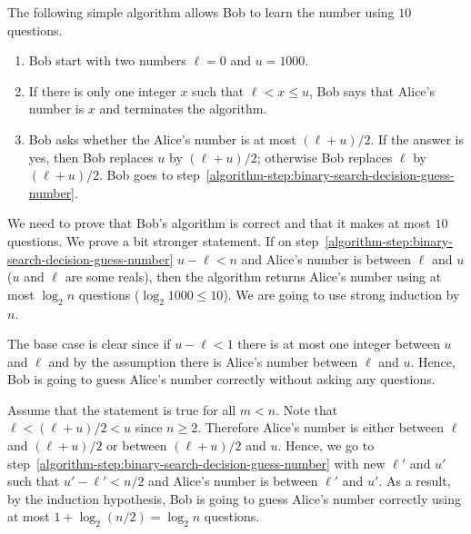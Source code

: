 The following simple algorithm allows Bob to learn the number using $10$
questions.

\begin{enumerate}
  \item Bob start with two numbers $\ell = 0$ and $u = 1000$.
  \item \label{algorithm-step:binary-search-result-guess-number}
    If there is only one integer $x$ such that $\ell < x \le u$, Bob says that
    Alice's number is $x$ and terminates the algorithm.
  \item \label{algorithm-step:binary-search-decision-guess-number}
    Bob asks whether the Alice's number is at most $(\ell + u) / 2$. If the
    answer is yes, then Bob replaces $u$ by $(\ell + u) / 2$; otherwise Bob
    replaces $\ell$ by $(\ell + u) / 2$.
    Bob goes to step~\ref{algorithm-step:binary-search-decision-guess-number}.
\end{enumerate}

We need to prove that Bob's algorithm is correct and that it makes at most $10$
questions. We prove a bit stronger statement. If on
step~\ref{algorithm-step:binary-search-decision-guess-number} $u - \ell < n$ and
Alice's number is between $\ell$ and $u$ ($u$ and $\ell$ are some reals), then
the algorithm returns Alice's number using at most $\log_2 n$ questions 
($\log_2 1000 \le 10$). We are going to use strong induction by $n$. 

The base case is clear since if $u - \ell < 1$ there is at most one integer
between $u$ and $\ell$ and by the assumption there is Alice's number between
$\ell$ and $u$. Hence, Bob is going to guess Alice's number correctly without asking
any questions.

Assume that the statement is true for all $m < n$. Note that 
$\ell < (\ell + u) / 2 < u$ since $n \ge 2$. Therefore Alice's number is either
between $\ell$ and $(\ell + u) / 2$ or between $(\ell + u) / 2$ and $u$. Hence,
we go to step~\ref{algorithm-step:binary-search-decision-guess-number} with new
$\ell'$ and $u'$ such that $u' - \ell' < n / 2$ and Alice's number is between
$\ell'$ and $u'$. As a result, by the induction hypothesis, Bob is going to
guess Alice's number correctly using at most $1 + \log_2 (n / 2) = \log_2 n$
questions.


